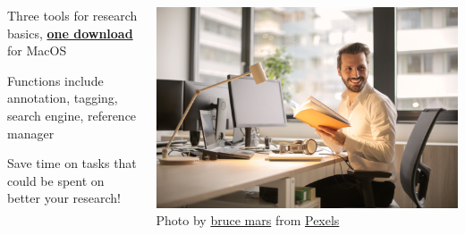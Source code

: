 \documentclass[unknownkeysallowed,usepdftitle=false, parskip=full]{beamer}
\newcommand{\secvariable}{nothing}
\begin{document}
\begin{frame}\label{\secvariable}
    \parbox{\linewidth}{

\begin{columns}[t]
\begin{column}[c]{0.5\textwidth}
      
      Three tools for research basics, \href{https://github.com/MQ-FOAR705/Osmond-Chiu---Proof-of-Concept---Implementation.git}{\textbf{one download}} for MacOS
 
      \vspace{12pt}
      
      Functions include annotation, tagging, search engine, reference manager
      
      \vspace{12pt}
 
      Save time on tasks that could be spent on better your research!

 \end{column}
    \begin{column}[c]{0.5\textwidth}

 
 \includegraphics[width=1\textwidth,height=0.5\textheight,keepaspectratio]{relax.jpg}\\
 Photo by \href{https://www.pexels.com/@olly?utm_content=attributionCopyText&utm_medium=referral&utm_source=pexels}{bruce mars} from  \href{https://www.pexels.com/photo/photo-of-man-holding-a-book-927022/?utm_content=attributionCopyText&utm_medium=referral&utm_source=pexels}{Pexels}
 
   \end{column}
  \end{columns}
}
 
\end{frame}
\end{document}
